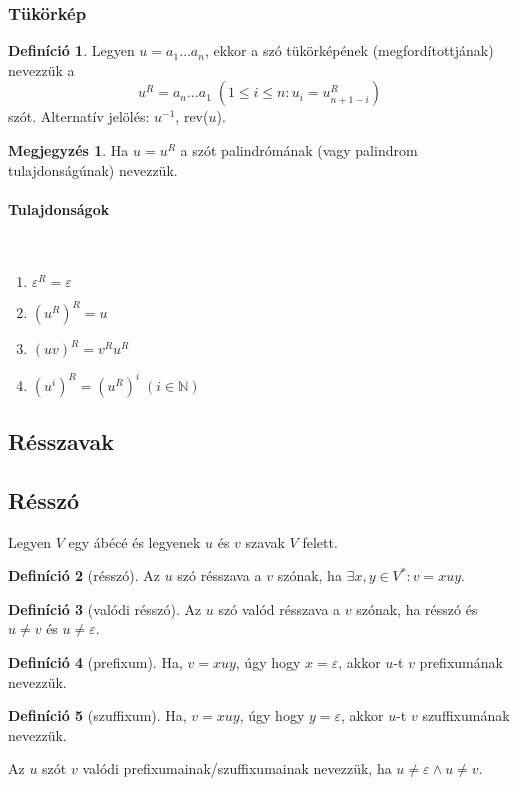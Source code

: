 \documentclass[a4paper,12pt]{article}
\theoremstyle{definition}
\newtheorem*{definition*}{Definíció}
\newtheorem*{remark}{Megjegyzés}
\begin{document}
	\subsubsection{Tükörkép}
	\begin{definition*}
		Legyen $ u = a_1 \dots a_n $, ekkor a szó tükörképének (megfordítottjának) nevezzük a
		\[
		u^R = a_n \dots a_1 \; (1 \le i \le n: u_i = u^R_{n+1-i})
		\]
		szót. Alternatív jelölés: $u^{-1}$, rev($ u $).
	\end{definition*}
	\begin{remark}
		Ha $u = u^R$ a szót palindrómának (vagy palindrom tulajdonságúnak) nevezzük.
	\end{remark}
	
	\paragraph{Tulajdonságok}\mbox{}\\[-20pt]
	
	\begin{multicols}{2}
		\begin{enumerate}
			\item{$ \varepsilon^R = \varepsilon $}
			\item{$ \left(u^R \right)^R = u $}
			\item{$ \left( uv \right)^R = v^R u^R $}
			\item{$ \left( u^i \right)^R = \left( u^R \right)^i \; (i \in \mathbb{N}) $}
		\end{enumerate}
	\end{multicols}
	\subsection{Résszavak}
	\subsection{Résszó}
	Legyen $V$ egy ábécé és legyenek $u$ és $v$ szavak $V$ felett.
	\begin{definition*}[résszó]
		Az $u$ szó résszava a $v$ szónak, ha $ \exists x,y \in V^*: v = xuy $.
	\end{definition*}
	\begin{definition*}[valódi résszó]
		Az $u$ szó valód résszava a $v$ szónak, ha résszó és $ u \ne v $ és $ u \ne \varepsilon $.
	\end{definition*}
	\begin{definition*}[prefixum]
		Ha, $ v = xuy$, úgy hogy $x = \varepsilon$, akkor $u$-t $v$ prefixumának nevezzük.
	\end{definition*}
	\begin{definition*}[szuffixum]
		Ha, $ v = xuy$, úgy hogy $y = \varepsilon$, akkor $u$-t $v$ szuffixumának nevezzük.
	\end{definition*}
	\noindent
	Az $u$ szót $v$ valódi prefixumainak/szuffixumainak nevezzük, ha $u \ne \varepsilon \land u \ne v $.
	
\end{document}
